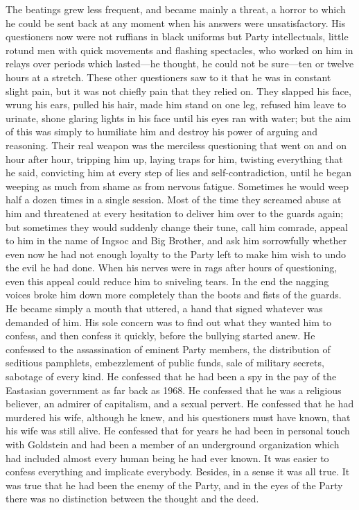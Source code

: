 \begin{paracol}{2}
The beatings grew less frequent, and became mainly a threat, a horror to
which he could be sent back at any moment when his answers were
unsatisfactory. His questioners now were not ruffians in black uniforms
but Party intellectuals, little rotund men with quick movements and
flashing spectacles, who worked on him in relays over periods which
lasted---he thought, he could not be sure---ten or twelve hours at a
stretch. These other questioners saw to it that he was in constant
slight pain, but it was not chiefly pain that they relied on. They
slapped his face, wrung his ears, pulled his hair, made him stand on one
leg, refused him leave to urinate, shone glaring lights in his face
until his eyes ran with water; but the aim of this was simply to
humiliate him and destroy his power of arguing and reasoning. Their real
weapon was the merciless questioning that went on and on hour after
hour, tripping him up, laying traps for him, twisting everything that he
said, convicting him at every step of lies and self-contradiction, until
he began weeping as much from shame as from nervous fatigue. Sometimes
he would weep half a dozen times in a single session. Most of the time
they screamed abuse at him and threatened at every hesitation to deliver
him over to the guards again; but sometimes they would suddenly change
their tune, call him comrade, appeal to him in the name of Ingsoc and
Big Brother, and ask him sorrowfully whether even now he had not enough
loyalty to the Party left to make him wish to undo the evil he had done.
When his nerves were in rags after hours of questioning, even this
appeal could reduce him to sniveling tears. In the end the nagging
voices broke him down more completely than the boots and fists of the
guards. He became simply a mouth that uttered, a hand that signed
whatever was demanded of him. His sole concern was to find out what they
wanted him to confess, and then confess it quickly, before the bullying
started anew. He confessed to the assassination of eminent Party
members, the distribution of seditious pamphlets, embezzlement of public
funds, sale of military secrets, sabotage of every kind. He confessed
that he had been a spy in the pay of the Eastasian government as far
back as 1968. He confessed that he was a religious believer, an admirer
of capitalism, and a sexual pervert. He confessed that he had murdered
his wife, although he knew, and his questioners must have known, that
his wife was still alive. He confessed that for years he had been in
personal touch with Goldstein and had been a member of an underground
organization which had included almost every human being he had ever
known. It was easier to confess everything and implicate everybody.
Besides, in a sense it was all true. It was true that he had been the
enemy of the Party, and in the eyes of the Party there was no
distinction between the thought and the deed.


\end{paracol}
